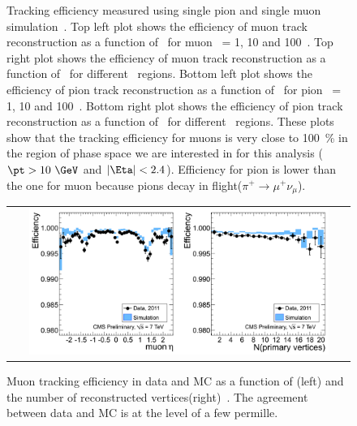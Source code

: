 \begin{figure}[htp]
\begin{tabular}{c}
\end{tabular}
\caption{Tracking efficiency measured using single pion 
and single muon simulation~\cite{TrkPerform}. 
Top left plot shows the efficiency of muon track reconstruction as a function of \Eta\
for muon \pt\ = 1, 10 and 100~\GeV. 
Top right plot shows the efficiency of muon track reconstruction as a function of \pt\
for different \Eta\ regions. 
Bottom left plot shows the efficiency of pion track reconstruction as a function of \Eta\
for pion \pt\ = 1, 10 and 100~\GeV. 
Bottom right plot shows the efficiency of pion track reconstruction as a function of \pt\
for different \Eta\ regions. 
These plots show that the tracking efficiency for muons is very close to 100~\% 
in the region of phase space we are interested in for this analysis
($\pt>10~\GeV$ and $|\Eta|<2.4$). Efficiency for pion is lower than the one for muon 
because pions decay in flight($\pi^+\to\mu^+\nu_\mu$).  
} 
\label{fig:TrackingEffMC} 
\end{figure} 

\begin{figure}[htp] 
\centering 
\begin{tabular}{c} 
\includegraphics[width=0.9\textwidth]{figures/MuonTagAndProbeEfficiency.png} 
\end{tabular} 
\caption{Muon tracking efficiency in data and MC as a function of 
\Eta(left) and the number of reconstructed vertices(right)~\cite{muonTrkPerform}. 
The agreement between data and MC is at the level of a few permille.} 
\label{fig:TrackingEffData} 
\end{figure} 



